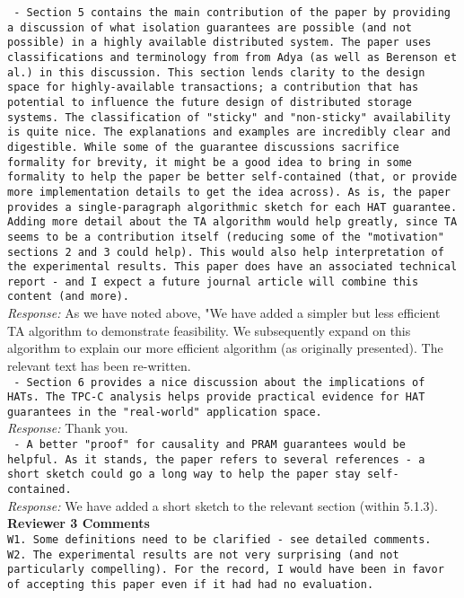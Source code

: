 \documentclass[10pt]{article}
\newcommand{\reviewer}[1] {\noindent\texttt{#1}\\}
\newcommand{\response}[1] {\noindent\textit{Response: } #1\\}
\begin{document}
\reviewer{ - Section 5 contains the main contribution of the paper by providing a discussion of what isolation guarantees are possible (and not possible) in a highly available distributed system. The paper uses classifications and terminology from from Adya (as well as Berenson et al.) in this discussion. This section lends clarity to the design space for highly-available transactions; a contribution that has potential to influence the future design of distributed storage systems. The classification of "sticky" and "non-sticky" availability is quite nice. The explanations and examples are incredibly clear and digestible. While some of the guarantee discussions sacrifice formality for brevity, it might be a good idea to bring in some formality to help the paper be better self-contained (that, or provide more implementation details to get the idea across). As is, the paper provides a single-paragraph algorithmic sketch for each HAT guarantee. Adding more detail about the TA algorithm would help greatly, since TA seems to be a contribution itself (reducing some of the "motivation" sections 2 and 3 could help). This would also help interpretation of the experimental results. This paper does have an associated technical report - and I expect a future journal article will combine this content (and more). }

\response{As we have noted above, "We have added a simpler but less efficient TA
algorithm to demonstrate feasibility. We subsequently expand on this
algorithm to explain our more efficient algorithm (as originally
presented). The relevant text has been re-written.}

\reviewer{ - Section 6 provides a nice discussion about the implications of HATs. The TPC-C analysis helps provide practical evidence for HAT guarantees in the "real-world" application space. }

\response{Thank you.}

\reviewer{ - A better "proof" for causality and PRAM guarantees would be helpful. As it stands, the paper refers to several references - a short sketch could go a long way to help the paper stay self-contained.}

\response{We have added a short sketch to the relevant section (within 5.1.3).}

\newpage
\noindent\textbf{Reviewer 3 Comments}\\

\reviewer{W1. Some definitions need to be clarified - see detailed comments. \\
W2. The experimental results are not very surprising (and not particularly compelling). For the 
record, I would have been in favor of accepting this paper even if it had had no evaluation. }
\end{document}
